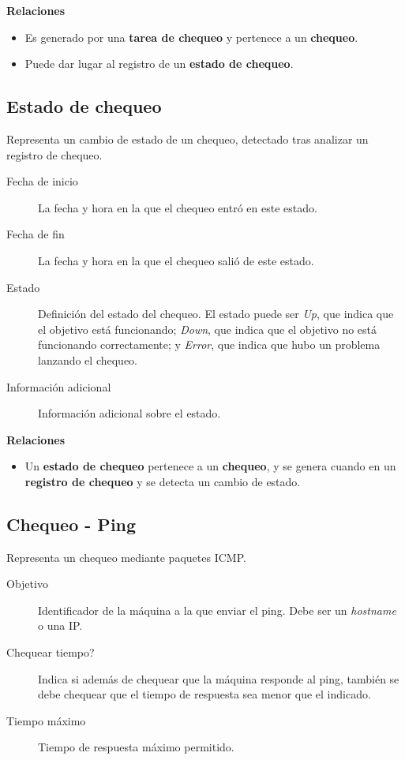 \textbf{Relaciones}

\begin{itemize}
\item Es generado por una \textbf{tarea de chequeo} y pertenece a un \textbf{chequeo}.
\item Puede dar lugar al registro de un \textbf{estado de chequeo}.
\end{itemize}


\subsection{Estado de chequeo}

Representa un cambio de estado de un chequeo, detectado tras analizar un registro de chequeo.

\begin{description}
\item[Fecha de inicio] La fecha y hora en la que el chequeo entró en este estado.
\item[Fecha de fin] La fecha y hora en la que el chequeo salió de este estado.
\item[Estado] Definición del estado del chequeo. El estado puede ser
  \textit{Up}, que indica que el objetivo está funcionando; \textit{Down}, que
  indica que el objetivo no está funcionando correctamente; y \textit{Error},
  que indica que hubo un problema lanzando el chequeo.
\item[Información adicional] Información adicional sobre el estado.
\end{description}

\textbf{Relaciones}

\begin{itemize}
\item Un \textbf{estado de chequeo} pertenece a un \textbf{chequeo}, y se genera cuando en un \textbf{registro de
    chequeo} y se detecta un cambio de estado.
\end{itemize}

\subsection{Chequeo - Ping}

Representa un chequeo mediante paquetes ICMP.

\begin{description}
\item[Objetivo] Identificador de la máquina a la que enviar el ping. Debe ser un
  \textit{hostname} o una IP.
\item[Chequear tiempo?] Indica si además de chequear que la máquina responde al
  ping, también se debe chequear que el tiempo de respuesta sea menor que el indicado.
\item[Tiempo máximo] Tiempo de respuesta máximo permitido.
\end{description}

